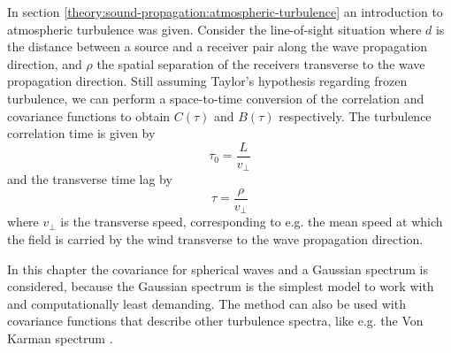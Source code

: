 In section \ref{theory:sound-propagation:atmospheric-turbulence} an introduction
to atmospheric turbulence was given. Consider the line-of-sight situation where
$d$ is the distance between a source and a receiver pair along the wave
propagation direction, and $\rho$ the spatial separation of the receivers
transverse to the wave propagation direction.
Still assuming Taylor's hypothesis regarding frozen turbulence, we can perform a
space-to-time conversion of the correlation and covariance functions to obtain
$C(\tau)$ and $B(\tau)$ respectively. The turbulence correlation time is given
by
\begin{equation}
 \tau_0 = \frac{L}{v_{\bot}}
\end{equation}
and the transverse time lag by
\begin{equation}
  \tau = \frac{\rho}{v_{\bot}}
\end{equation}
where $v_{\bot}$ is the transverse speed, corresponding to e.g. the mean speed
at which the field is carried by the wind transverse to the wave propagation
direction.

In this chapter the covariance for spherical waves and a Gaussian spectrum is
considered, because the Gaussian spectrum is the simplest model to work with and
computationally least demanding. The method can also be used with covariance
functions that describe other turbulence spectra, like e.g. the Von Karman
spectrum \cite{Ostashev2015}.

